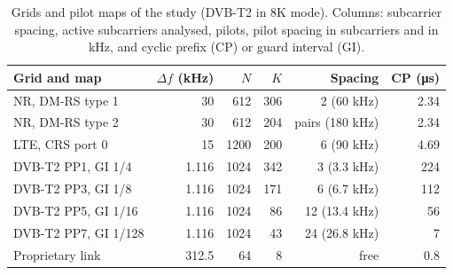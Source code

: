 \begin{table}[t]
\centering
\caption{Grids and pilot maps of the study (DVB-T2 in 8K mode). Columns: subcarrier spacing, active subcarriers analysed, pilots, pilot spacing in subcarriers and in kHz, and cyclic prefix (CP) or guard interval (GI).}
\label{tab:setup}
\footnotesize
\setlength{\tabcolsep}{2.5pt}
\begin{tabular}{lrrrrr}
\toprule
Grid and map & $\Delta f$ (kHz) & $N$ & $K$ & Spacing & CP (\si{\micro\second}) \\
\midrule
NR, DM-RS type 1 & 30 & 612 & 306 & 2 (60 kHz) & 2.34 \\
NR, DM-RS type 2 & 30 & 612 & 204 & pairs (180 kHz) & 2.34 \\
LTE, CRS port 0 & 15 & 1200 & 200 & 6 (90 kHz) & 4.69 \\
DVB-T2 PP1, GI 1/4 & 1.116 & 1024 & 342 & 3 (3.3 kHz) & 224 \\
DVB-T2 PP3, GI 1/8 & 1.116 & 1024 & 171 & 6 (6.7 kHz) & 112 \\
DVB-T2 PP5, GI 1/16 & 1.116 & 1024 & 86 & 12 (13.4 kHz) & 56 \\
DVB-T2 PP7, GI 1/128 & 1.116 & 1024 & 43 & 24 (26.8 kHz) & 7 \\
Proprietary link & 312.5 & 64 & 8 & free & 0.8 \\
\bottomrule
\end{tabular}
\end{table}
